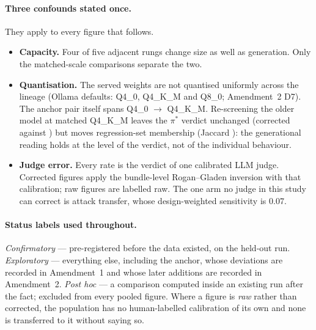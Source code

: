 \paragraph{Three confounds stated once.} They apply to every figure that follows.
\begin{itemize}
  \item \textbf{Capacity.} Four of five adjacent rungs change size as well as generation. Only the
    matched-scale comparisons separate the two.
  \item \textbf{Quantisation.} The served weights are not quantised uniformly across the lineage
    (Ollama defaults: Q4\_0, Q4\_K\_M and Q8\_0; Amendment~2 D7). The anchor pair itself spans
    Q4\_0 $\rightarrow$ Q4\_K\_M. Re-screening the older model at matched Q4\_K\_M leaves the
    $\pi^\ast$ verdict unchanged (corrected \rbQuantACorr{} against \rbQuantBCorr{}) but moves
    regression-set membership (Jaccard \rbQuantJaccard{}): the generational reading holds at the level
    of the verdict, not of the individual behaviour.
  \item \textbf{Judge error.} Every rate is the verdict of one calibrated LLM judge. Corrected figures
    apply the bundle-level Rogan--Gladen inversion with that calibration; raw figures are labelled
    raw. The one arm no judge in this study can correct is attack transfer, whose design-weighted
    sensitivity is 0.07.
\end{itemize}

\paragraph{Status labels used throughout.} \emph{Confirmatory} --- pre-registered before the data
existed, on the held-out run. \emph{Exploratory} --- everything else, including the anchor, whose
deviations are recorded in Amendment~1 and whose later additions are recorded in Amendment~2.
\emph{Post hoc} --- a comparison computed inside an existing run after the fact; excluded from every
pooled figure. Where a figure is \emph{raw} rather than corrected, the population has no human-labelled
calibration of its own and none is transferred to it without saying so.
